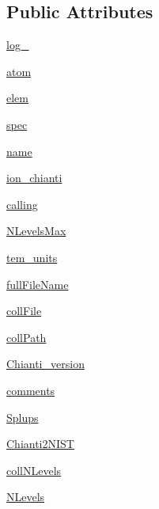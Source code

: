 \subsection*{Public Attributes}
\begin{DoxyCompactItemize}
\item 
\hyperlink{classpyneb_1_1utils_1_1pn__chianti_1_1___coll_chianti_a1bb28a8bbcbca5499d0588860cd4280f}{log\+\_\+}
\item 
\hyperlink{classpyneb_1_1utils_1_1pn__chianti_1_1___coll_chianti_a904418982790fd63f2324fec90636bb6}{atom}
\item 
\hyperlink{classpyneb_1_1utils_1_1pn__chianti_1_1___coll_chianti_a83fc37382d9eb03922e67dacc6ca66d0}{elem}
\item 
\hyperlink{classpyneb_1_1utils_1_1pn__chianti_1_1___coll_chianti_a665d7e8537b9ccec445bde02d78f8e93}{spec}
\item 
\hyperlink{classpyneb_1_1utils_1_1pn__chianti_1_1___coll_chianti_ac2de9885177db13b72b7f9a937cc3544}{name}
\item 
\hyperlink{classpyneb_1_1utils_1_1pn__chianti_1_1___coll_chianti_af0f28fb84d1ceb9d64e40429c981a6f6}{ion\+\_\+chianti}
\item 
\hyperlink{classpyneb_1_1utils_1_1pn__chianti_1_1___coll_chianti_ab58a9cfcb76b7c72b9b815c5700e7aae}{calling}
\item 
\hyperlink{classpyneb_1_1utils_1_1pn__chianti_1_1___coll_chianti_aa3eaa6c3196c09e49430e4aedeea9fe1}{N\+Levels\+Max}
\item 
\hyperlink{classpyneb_1_1utils_1_1pn__chianti_1_1___coll_chianti_ac8f0c1513ef4a2f2d12c59fa380a495c}{tem\+\_\+units}
\item 
\hyperlink{classpyneb_1_1utils_1_1pn__chianti_1_1___coll_chianti_abe0d4b4734d0426b2053329f466793c4}{full\+File\+Name}
\item 
\hyperlink{classpyneb_1_1utils_1_1pn__chianti_1_1___coll_chianti_aafcdb306ebd11d4b89fd80923a8d69c9}{coll\+File}
\item 
\hyperlink{classpyneb_1_1utils_1_1pn__chianti_1_1___coll_chianti_af593f39e6cd3d3def54951d5c5f9a400}{coll\+Path}
\item 
\hyperlink{classpyneb_1_1utils_1_1pn__chianti_1_1___coll_chianti_af02b0dfb67aec7e96a92b42f2ba26699}{Chianti\+\_\+version}
\item 
\hyperlink{classpyneb_1_1utils_1_1pn__chianti_1_1___coll_chianti_acd3ca55d5ead72cdfd0c8cf718898d0e}{comments}
\item 
\hyperlink{classpyneb_1_1utils_1_1pn__chianti_1_1___coll_chianti_abbdbf5533a480f46baceccc2885d7467}{Splups}
\item 
\hyperlink{classpyneb_1_1utils_1_1pn__chianti_1_1___coll_chianti_a1d2846276b84d8ec47c08b7d32eb7756}{Chianti2\+N\+I\+S\+T}
\item 
\hyperlink{classpyneb_1_1utils_1_1pn__chianti_1_1___coll_chianti_aca0906388fe4f71d74dfefe17a1d1906}{coll\+N\+Levels}
\item 
\hyperlink{classpyneb_1_1utils_1_1pn__chianti_1_1___coll_chianti_a453595ef60eae9d063e2a24ef43002f5}{N\+Levels}
\end{DoxyCompactItemize}
